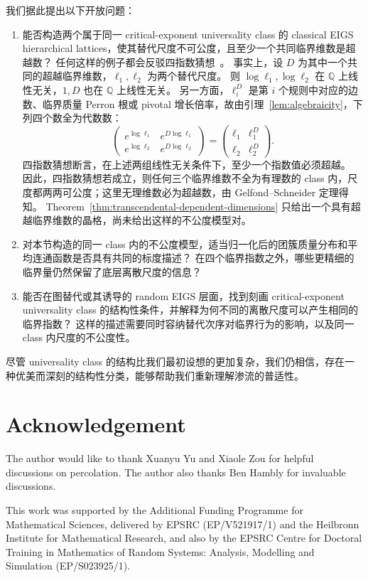 \documentclass[scheme=plain,11pt]{ctexart}
\theoremstyle{definition}
\theoremstyle{remark}
\begin{document}
我们据此提出以下开放问题：
\begin{enumerate}[leftmargin=*,itemsep=0.4em]
\item 能否构造两个属于同一 critical-exponent universality class 的 classical EIGS hierarchical lattices，使其替代尺度不可公度，且至少一个共同临界维数是超越数？
任何这样的例子都会反驳四指数猜想~\cite{dasgupta2021transcendence}。
事实上，设 $D$ 为其中一个共同的超越临界维数，$\ell_1,\ell_2$ 为两个替代尺度。
则 $\log\ell_1,\log\ell_2$ 在 $\mathbb Q$ 上线性无关，$1,D$ 也在 $\mathbb Q$ 上线性无关。
另一方面，$\ell_i^D$ 是第 $i$ 个规则中对应的边数、临界质量 Perron 根或 pivotal 增长倍率，故由引理~\ref{lem:algebraicity}，下列四个数全为代数数：
\[
 \begin{pmatrix}
 e^{\log\ell_1}&e^{D\log\ell_1}\\
 e^{\log\ell_2}&e^{D\log\ell_2}
 \end{pmatrix}
 =\begin{pmatrix}
 \ell_1&\ell_1^D\\
 \ell_2&\ell_2^D
 \end{pmatrix}.
\]
四指数猜想断言，在上述两组线性无关条件下，至少一个指数值必须超越。
因此，四指数猜想若成立，则任何三个临界维数不全为有理数的 class 内，尺度都两两可公度；这里无理维数必为超越数，由 Gelfond--Schneider 定理得知。
Theorem~\ref{thm:transcendental-dependent-dimensions} 只给出一个具有超越临界维数的晶格，尚未给出这样的不公度模型对。
\item 对本节构造的同一 class 内的不公度模型，适当归一化后的团簇质量分布和平均连通函数是否具有共同的标度描述？
在四个临界指数之外，哪些更精细的临界量仍然保留了底层离散尺度的信息？
\item 能否在图替代或其诱导的 random EIGS 层面，找到刻画 critical-exponent universality class 的结构性条件，并解释为何不同的离散尺度可以产生相同的临界指数？
这样的描述需要同时容纳替代次序对临界行为的影响，以及同一 class 内尺度的不公度性。
\end{enumerate}

尽管 universality class 的结构比我们最初设想的更加复杂，我们仍相信，存在一种优美而深刻的结构性分类，能够帮助我们重新理解渗流的普适性。


\section*{Acknowledgement}
The author would like to thank Xuanyu Yu and Xiaole Zou for helpful discussions on percolation.
The author also thanks Ben Hambly for invaluable discussions.

This work was supported by the Additional Funding Programme for Mathematical Sciences, delivered by EPSRC (EP/V521917/1) and the Heilbronn Institute for Mathematical Research,
and also by the EPSRC Centre for Doctoral Training in Mathematics of Random Systems: Analysis, Modelling and Simulation (EP/S023925/1).
\end{document}
